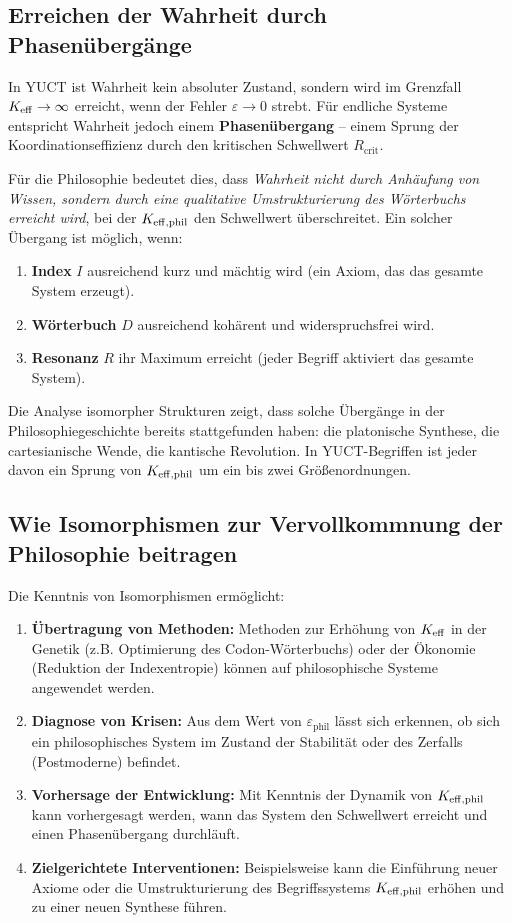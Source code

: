 \documentclass[12pt,a4paper]{article}
\newcommand{\eps}{\varepsilon}
\newcommand{\Rcrit}{R_{\mathrm{crit}}}
\begin{document}
	\subsection{Erreichen der Wahrheit durch Phasenübergänge}
	
	In YUCT ist Wahrheit kein absoluter Zustand, sondern wird im Grenzfall \(\Keff \to \infty\) erreicht, wenn der Fehler \(\eps \to 0\) strebt. Für endliche Systeme entspricht Wahrheit jedoch einem \textbf{Phasenübergang} – einem Sprung der Koordinationseffizienz durch den kritischen Schwellwert \(\Rcrit\).
	
	Für die Philosophie bedeutet dies, dass \emph{Wahrheit nicht durch Anhäufung von Wissen, sondern durch eine qualitative Umstrukturierung des Wörterbuchs erreicht wird}, bei der \(\Keff[\text{phil}]\) den Schwellwert überschreitet. Ein solcher Übergang ist möglich, wenn:
	
	\begin{enumerate}
		\item \textbf{Index} \(I\) ausreichend kurz und mächtig wird (ein Axiom, das das gesamte System erzeugt).
		\item \textbf{Wörterbuch} \(D\) ausreichend kohärent und widerspruchsfrei wird.
		\item \textbf{Resonanz} \(R\) ihr Maximum erreicht (jeder Begriff aktiviert das gesamte System).
	\end{enumerate}
	
	Die Analyse isomorpher Strukturen zeigt, dass solche Übergänge in der Philosophiegeschichte bereits stattgefunden haben: die platonische Synthese, die cartesianische Wende, die kantische Revolution. In YUCT-Begriffen ist jeder davon ein Sprung von \(\Keff[\text{phil}]\) um ein bis zwei Größenordnungen.
	
	\subsection{Wie Isomorphismen zur Vervollkommnung der Philosophie beitragen}
	
	Die Kenntnis von Isomorphismen ermöglicht:
	
	\begin{enumerate}
		\item \textbf{Übertragung von Methoden:} Methoden zur Erhöhung von \(\Keff\) in der Genetik (z.B. Optimierung des Codon-Wörterbuchs) oder der Ökonomie (Reduktion der Indexentropie) können auf philosophische Systeme angewendet werden.
		\item \textbf{Diagnose von Krisen:} Aus dem Wert von \(\eps_{\text{phil}}\) lässt sich erkennen, ob sich ein philosophisches System im Zustand der Stabilität oder des Zerfalls (Postmoderne) befindet.
		\item \textbf{Vorhersage der Entwicklung:} Mit Kenntnis der Dynamik von \(\Keff[\text{phil}]\) kann vorhergesagt werden, wann das System den Schwellwert erreicht und einen Phasenübergang durchläuft.
		\item \textbf{Zielgerichtete Interventionen:} Beispielsweise kann die Einführung neuer Axiome oder die Umstrukturierung des Begriffssystems \(\Keff[\text{phil}]\) erhöhen und zu einer neuen Synthese führen.
	\end{enumerate}
	
\end{document}
